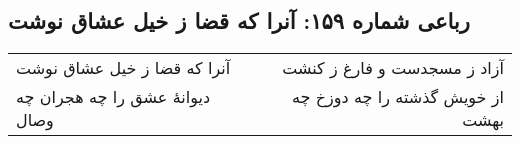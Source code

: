 \begin{center}
\section*{رباعی شماره ۱۵۹: آنرا که قضا ز خیل عشاق نوشت}
\label{sec:sh159}
\begin{longtable}{l p{0.5cm} r}
آنرا که قضا ز خیل عشاق نوشت
&&
آزاد ز مسجدست و فارغ ز کنشت
\\
دیوانهٔ عشق را چه هجران چه وصال
&&
از خویش گذشته را چه دوزخ چه بهشت
\\
\end{longtable}
\end{center}
